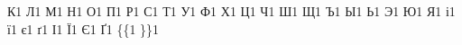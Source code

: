 {    {К}{{\selectfont{}}}1
    {Л}{{\selectfont{}}}1
    {М}{{\selectfont{}}}1
    {Н}{{\selectfont{}}}1
    {О}{{\selectfont{}}}1
    {П}{{\selectfont{}}}1
    {Р}{{\selectfont{}}}1
    {С}{{\selectfont{}}}1
    {Т}{{\selectfont{}}}1
    {У}{{\selectfont{}}}1
    {Ф}{{\selectfont{}}}1
    {Х}{{\selectfont{}}}1
    {Ц}{{\selectfont{}}}1
    {Ч}{{\selectfont{}}}1
    {Ш}{{\selectfont{}}}1
    {Щ}{{\selectfont{}}}1
    {Ъ}{{\selectfont{}}}1
    {Ы}{{\selectfont{}}}1
    {Ь}{{\selectfont{}}}1
    {Э}{{\selectfont{}}}1
    {Ю}{{\selectfont{}}}1
    {Я}{{\selectfont{}}}1
    {і}{{\selectfont{}}}1
    {ї}{{\selectfont{}}}1
    {є}{{\selectfont{}}}1
    {ґ}{{\selectfont{}}}1
    {І}{{\selectfont{}}}1
    {Ї}{{\selectfont{}}}1
    {Є}{{\selectfont{}}}1
    {Ґ}{{\selectfont{}}}1
    {\{}{{{\color{brackets}\{}}}1 %
    {\}}{{{\color{brackets}\}}}}1 %
}




\begin{comment}
\lstdefinestyle{basic}{  
  basicstyle=\footnotesize\ttfamily,
  numbers=left,
  numberstyle=\tiny\color{gray}\ttfamily,
  numbersep=5pt,
  backgroundcolor=\color{white},
  showspaces=false,
  showstringspaces=false,
  showtabs=false,
  frame=single,
  rulecolor=\color{black},
  captionpos=b,
  keywordstyle=\color{blue}\bf,
  commentstyle=\color{gray},
  stringstyle=\color{green},
  keywordstyle={[2]\color{red}\bf},
}
\end{comment}

\begin{comment}
\AtBeginDocument{%
  \renewcommand{\thelstlisting}{%
    \ifnum\value{subsection}=0
      \thesection.\arabic{lstlisting}%
    \else
      \ifnum\value{subsubsection}=0
        \thesubsection.\arabic{lstlisting}%
      \else
        \thesubsubsection.\arabic{lstlisting}%
      \fi
    \fi
  }
}
\end{comment}

\begin{comment}
\AtBeginDocument{%
  \renewcommand{\thelstlisting}{%
      \thesection.\arabic{lstlisting}%
  }
}
\end{comment}



